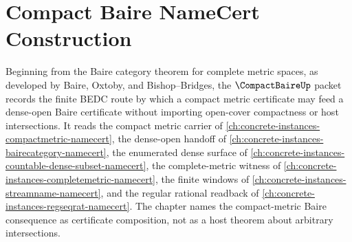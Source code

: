 \chapter{Compact Baire NameCert Construction}
\label{ch:concrete-instances-compact-baire-namecert}

Beginning from the Baire category theorem for complete metric spaces, as developed by Baire, Oxtoby, and Bishop--Bridges, the $\CompactBaireUp$ packet records the finite BEDC route by which a compact metric certificate may feed a dense-open Baire certificate without importing open-cover compactness or host intersections. It reads the compact metric carrier of \autoref{ch:concrete-instances-compactmetric-namecert}, the dense-open handoff of \autoref{ch:concrete-instances-bairecategory-namecert}, the enumerated dense surface of \autoref{ch:concrete-instances-countable-dense-subset-namecert}, the complete-metric witness of \autoref{ch:concrete-instances-completemetric-namecert}, the finite windows of \autoref{ch:concrete-instances-streamname-namecert}, and the regular rational readback of \autoref{ch:concrete-instances-regseqrat-namecert}. The chapter names the compact-metric Baire consequence as certificate composition, not as a host theorem about arbitrary intersections.

